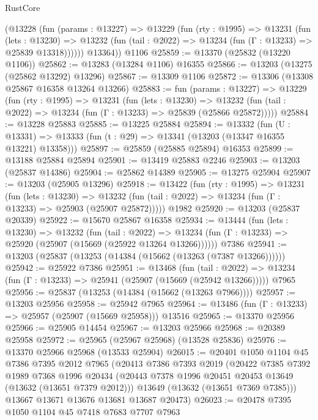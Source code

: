 \begin{lexlean}{RustCore}
\begin{coremodule}
        (@13228
          (fun (params : @13227) =>
          @13229
            (fun (rty : @1995) =>
            @13231
              (fun (lets : @13230) =>
              @13232 (fun (tail : @2022) => @13234 (fun (Γ : @13233) => @25839 @13318))))))
        @13364))
    @1106
@25859 := @13370 (@25832 (@13220 @1106))
@25862 := @13283 (@13284 @1106) @16355
@25866 := @13203 (@13275 (@25862 @13292) @13296)
@25867 := @13309 @1106
@25872 := @13306 (@13308 @25867 @16358 @13264 @13266)
@25883 := fun (params : @13227) =>
  @13229
    (fun (rty : @1995) =>
    @13231
      (fun (lets : @13230) =>
      @13232 (fun (tail : @2022) => @13234 (fun (Γ : @13233) => @25839 (@25866 @25872)))))
@25884 := @13228 @25883
@25885 := @13225 @25884
@25894 := @13332
    (fun (U : @13331) => @13333 (fun (t : @29) => @13341 (@13203 (@13347 @16355 @13221) @13358)))
@25897 := @25859 (@25885 @25894) @16353
@25899 := @13188 @25884 @25894
@25901 := @13419 @25883 @2246
@25903 := @13203 (@25837 @14386)
@25904 := @25862 @14389
@25905 := @13275 @25904
@25907 := @13203 (@25905 @13296)
@25918 := @13422
    (fun (rty : @1995) =>
    @13231
      (fun (lets : @13230) =>
      @13232 (fun (tail : @2022) => @13234 (fun (Γ : @13233) => @25903 (@25907 @25872)))))
    @1982
@25920 := @13203 (@25837 @20339)
@25922 := @15670 @25867 @16358
@25934 := @13444
    (fun (lets : @13230) =>
    @13232
      (fun (tail : @2022) =>
      @13234 (fun (Γ : @13233) => @25920 (@25907 (@15669 (@25922 @13264 @13266))))))
    @7386
@25941 := @13203 (@25837 (@13253 (@14384 (@15662 (@13263 (@7387 @13266))))))
@25942 := @25922 @7386
@25951 := @13468
    (fun (tail : @2022) => @13234 (fun (Γ : @13233) => @25941 (@25907 (@15669 (@25942 @13266)))))
    @7965
@25956 := @25837 (@13253 (@14384 (@15662 (@13263 @7966))))
@25957 := @13203 @25956
@25958 := @25942 @7965
@25964 := @13486 (fun (Γ : @13233) => @25957 (@25907 (@15669 @25958))) @13516
@25965 := @13370 @25956
@25966 := @25905 @14454
@25967 := @13203 @25966
@25968 := @20389 @25958
@25972 := @25965 (@25967 @25968) (@13528 @25836)
@25976 := @13370 @25966 @25968 (@13533 @25904)
@26015 := @20401
    @1050
    @1104
    @45
    @7386
    @7395
    @2012
    @7965
    (@20413
      @7386
      @7393
      @2019
      (@20422
        @7385
        @7392
        @1989
        @7368
        @1996
        @20434
        (@20443 @7378 @1996 @20451 @20453 @13649 (@13632 (@13651 @7379 @2012)))
        @13649
        (@13632 (@13651 @7369 @7385)))
      @13667
      @13671
      @13676
      @13681
      @13687
      @20473)
@26023 := @20478 @7395 @1050 @1104 @45 @7418 @7683 @7707 @7963

\end{coremodule}
\end{lexlean}
